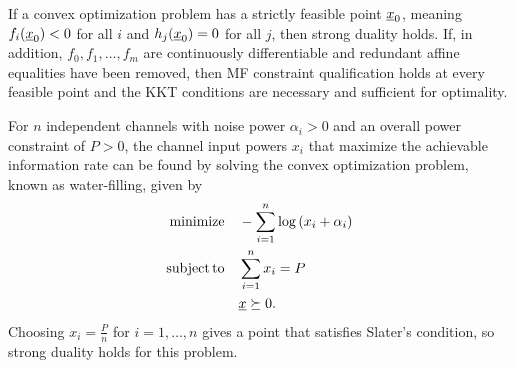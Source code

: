 \begin{theorem}
If a convex optimization problem has a strictly feasible point $\underline{x}_0$, meaning $f_i(\underline{x}_0)<0$ for all $i$ and $h_j(\underline{x}_0)=0$ for all $j$, then strong duality holds.  
If, in addition, $f_0,f_1,\ldots,f_m$ are continuously differentiable and redundant affine equalities have been removed, then MF constraint qualification holds at every feasible point and the KKT conditions are necessary and sufficient for optimality.
\end{theorem}

\begin{example}
For $n$ independent channels with noise power $\alpha_i >0$ and an overall power constraint of $P>0$, the channel input powers $x_i$ that maximize the achievable information rate can be found by solving the convex optimization problem, known as water-filling, given by
\begin{align*}
\mathrm{minimize} \quad & -\sum_{i=1}^n \log \left( x_i + \alpha_i \right) \\
\mathrm{subject\,to} \quad & \sum_{i=1}^n x_i = P \\
& \underline{x} \succeq 0.
\end{align*}
Choosing $x_i = \frac{P}{n}$ for $i=1,\ldots,n$ gives a point that satisfies Slater's condition, so strong duality holds for this problem.
\end{example}

